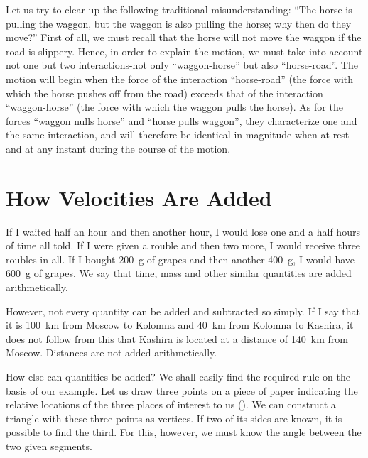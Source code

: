 Let us try to clear up the following traditional misunderstanding:
``The horse is pulling the waggon, but the waggon is also pulling the
horse; why then do they move?'' First of all, we must recall that the
horse will not move the waggon if the road is slippery. Hence, in
order to explain the motion, we must take into account not one but two
interactions-not only ``waggon-horse'' but also ``horse-road''. The
motion will begin when the force of the interaction ``horse-road''
(the force with which the horse pushes off from the road) exceeds that
of the interaction ``waggon-horse'' (the force with which the waggon
pulls the horse). As for the forces ``waggon nulls horse'' and ``horse
pulls waggon'', they characterize one and the same interaction, and
will therefore be identical in magnitude when at rest and at any
instant during the course of the motion.
\section{How Velocities Are Added}

If I waited half an hour and then another hour, I would lose one and a
half hours of time all told. If I were given a rouble and then two
more, I would receive three roubles in all. If I bought
\SI{200}{\gram} of grapes and then another \SI{400}{\gram}, I would
have \SI{600}{\gram} of grapes. We say that time, mass and other
similar quantities are added arithmetically.

However, not every quantity can be added and subtracted so simply. If
I say that it is \SI{100}{\km} from Moscow to Kolomna and \SI{40}{\km}
from Kolomna to Kashira, it does not follow from this that Kashira is
located at a distance of \SI{140}{\km} from Moscow. Distances are not
added arithmetically.  

How else can quantities be added? We shall easily find the required
rule on the basis of our example. Let us draw three points on a piece
of paper indicating the relative locations of the three places of
interest to us (). We can
construct a triangle with these three points as vertices. If two of
its sides are known, it is possible to find the third. For this,
however, we must know the angle between the two given segments.

